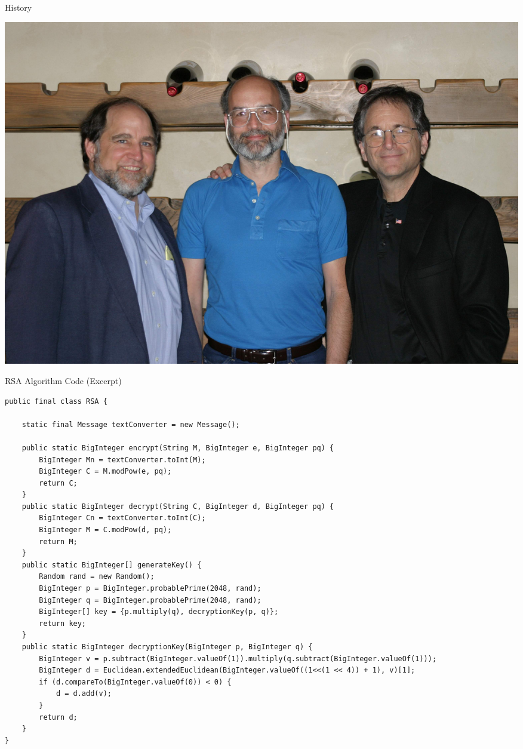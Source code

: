 \documentclass[landscape,fontscale=.8,paperwidth=24in,paperheight=18in]{baposter} %
\begin{document}
\begin{poster}
\begin{posterbox}[name=history, column=13, below=rsa,span=17]{History}
\begin{multicols}{2}
\begin{center}
\includegraphics[width=1\linewidth]{RSA-2003.jpg}
\end{center}
\end{multicols}
\end{posterbox}




\begin{posterbox}[name=code,column=30,span=28,row=0]{RSA Algorithm Code (Excerpt)}

{\begin{verbatim}
public final class RSA {

    static final Message textConverter = new Message();

    public static BigInteger encrypt(String M, BigInteger e, BigInteger pq) {
        BigInteger Mn = textConverter.toInt(M);
        BigInteger C = M.modPow(e, pq);        
        return C;
    }
    public static BigInteger decrypt(String C, BigInteger d, BigInteger pq) {
        BigInteger Cn = textConverter.toInt(C);
        BigInteger M = C.modPow(d, pq);
        return M;
    }
    public static BigInteger[] generateKey() {
        Random rand = new Random();
        BigInteger p = BigInteger.probablePrime(2048, rand);
        BigInteger q = BigInteger.probablePrime(2048, rand);
        BigInteger[] key = {p.multiply(q), decryptionKey(p, q)};
        return key;
    }
    public static BigInteger decryptionKey(BigInteger p, BigInteger q) {
        BigInteger v = p.subtract(BigInteger.valueOf(1)).multiply(q.subtract(BigInteger.valueOf(1)));
        BigInteger d = Euclidean.extendedEuclidean(BigInteger.valueOf((1<<(1 << 4)) + 1), v)[1];
        if (d.compareTo(BigInteger.valueOf(0)) < 0) {
            d = d.add(v);
        }
        return d;
    }
}


\end{verbatim}}
\end{posterbox}
\end{poster}
\end{document}
